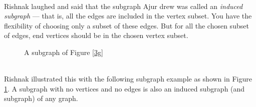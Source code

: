 \\
\noindent
Rishnak laughed and said that the subgraph Ajur drew was called an \textit {induced subgraph} --- that is, all the edges are included in the vertex subset. You have the flexibility of choosing only a subset of these edges. But for all the chosen subset of edges, end vertices should be in the chosen vertex subset. 
\\
\begin{figure}
\begin{center}
\caption{A subgraph of Figure \ref{3g}}\label{3g2}
\end{center}
\end{figure}
\\
\noindent
Rishnak illustrated this with the following subgraph example as shown in Figure \ref{3g2}. A subgraph with no vertices and no edges is also an induced subgraph (and subgraph) of any graph.



